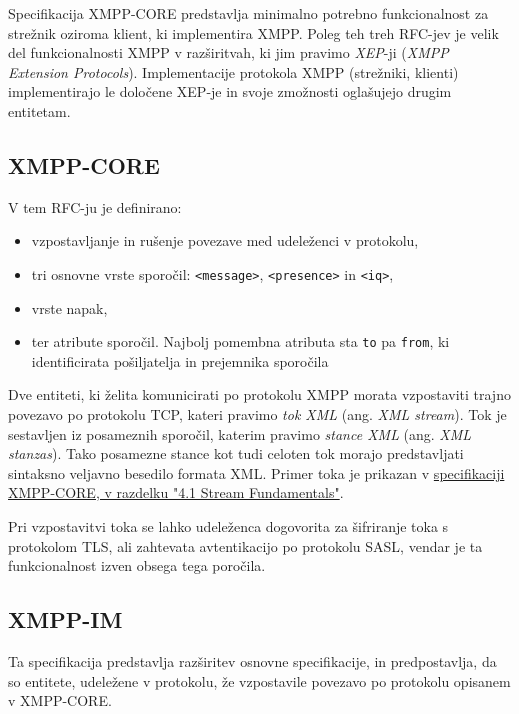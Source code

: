 \documentclass[11pt]{article}
\begin{document}
Specifikacija XMPP-CORE predstavlja minimalno potrebno funkcionalnost
za strežnik oziroma klient, ki implementira XMPP. Poleg teh treh
RFC-jev je velik del funkcionalnosti XMPP v razširitvah, ki jim
pravimo \emph{XEP}-ji (\emph{XMPP Extension Protocols}). Implementacije
protokola XMPP (strežniki, klienti) implementirajo le določene XEP-je
in svoje zmožnosti oglašujejo drugim entitetam.

\subsection{XMPP-CORE}
\label{sec:orgdc6485f}

V tem RFC-ju je definirano:

\begin{itemize}
\item vzpostavljanje in rušenje povezave med udeleženci v protokolu,
\item tri osnovne vrste sporočil: \texttt{<message>}, \texttt{<presence>} in \texttt{<iq>},
\item vrste napak,
\item ter atribute sporočil. Najbolj pomembna atributa sta \texttt{to} pa \texttt{from},
ki identificirata pošiljatelja in prejemnika sporočila
\end{itemize}

Dve entiteti, ki želita komunicirati po protokolu XMPP morata
vzpostaviti trajno povezavo po protokolu TCP, kateri pravimo \emph{tok XML}
(ang. \emph{XML stream}). Tok je sestavljen iz posameznih sporočil, katerim
pravimo \emph{stance XML} (ang. \emph{XML stanzas}). Tako posamezne stance kot
tudi celoten tok morajo predstavljati sintaksno veljavno besedilo
formata XML. Primer toka je prikazan v \href{https://xmpp.org/rfcs/rfc6120.html\#streams-fundamentals}{specifikaciji XMPP-CORE, v
razdelku "4.1 Stream Fundamentals"}.

Pri vzpostavitvi toka se lahko udeleženca dogovorita za šifriranje
toka s protokolom TLS, ali zahtevata avtentikacijo po protokolu SASL,
vendar je ta funkcionalnost izven obsega tega poročila.

\subsection{XMPP-IM}
\label{sec:orgabe2eeb}

Ta specifikacija predstavlja razširitev osnovne specifikacije, in
predpostavlja, da so entitete, udeležene v protokolu, že vzpostavile
povezavo po protokolu opisanem v XMPP-CORE.
\end{document}
